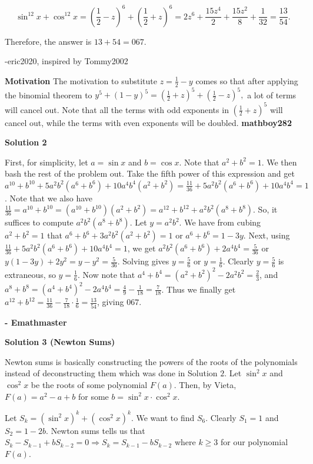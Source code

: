 \begin{enumerate}
 
 \[\sin^{12}{x}+\cos^{12}{x}=\left(\frac{1}{2}-z\right)^6+\left(\frac{1}{2}+z\right)^6=2z^6 + \frac{15z^4}{2} + \frac{15z^2}{8} + \frac{1}{32}=\frac{13}{54}.\]

 Therefore, the answer is $13+54=\boxed{067}$.

 -eric2020, inspired by Tommy2002

 \textbf{Motivation} The motivation to substitute $z=\frac{1}{2}-y$ comes so that after applying the binomial theorem to $y^5+(1-y)^5=\left(\frac{1}{2}+z\right)^5+\left(\frac{1}{2}-z\right)^5,$ a lot of terms will cancel out. Note that all the terms with odd exponents in $\left(\frac{1}{2}+z\right)^5$ will cancel out, while the terms with even exponents will be doubled. \textbf{mathboy282}

 



\textbf{Solution 2}

First, for simplicity, let $a=\sin{x}$ and $b=\cos{x}$. Note that $a^2+b^2=1$. We then bash the rest of the problem out. Take the fifth power of this expression and get $a^{10}+b^{10}+5a^2b^2(a^6+b^6)+10a^4b^4(a^2+b^2)=\frac{11}{36}+5a^2b^2(a^6+b^6)+10a^4b^4=1$. Note that we also have $\frac{11}{36}=a^{10}+b^{10}=(a^{10}+b^{10})(a^2+b^2)=a^{12}+b^{12}+a^2b^2(a^8+b^8)$. So, it suffices to compute $a^2b^2(a^8+b^8)$. Let $y=a^2b^2$. We have from cubing $a^2+b^2=1$ that $a^6+b^6+3a^2b^2(a^2+b^2)=1$ or $a^6+b^6=1-3y$. Next, using $\frac{11}{36}+5a^2b^2(a^6+b^6)+10a^4b^4=1$, we get $a^2b^2(a^6+b^6)+2a^4b^4=\frac{5}{36}$ or $y(1-3y)+2y^2=y-y^2=\frac{5}{36}$. Solving gives $y=\frac{5}{6}$ or $y=\frac{1}{6}$. Clearly $y=\frac{5}{6}$ is extraneous, so $y=\frac{1}{6}$. Now note that $a^4+b^4=(a^2+b^2)^2-2a^2b^2=\frac{2}{3}$, and $a^8+b^8=(a^4+b^4)^2-2a^4b^4=\frac{4}{9}-\frac{1}{18}=\frac{7}{18}$. Thus we finally get $a^{12}+b^{12}=\frac{11}{36}-\frac{7}{18}\cdot\frac{1}{6}=\frac{13}{54}$, giving $\boxed{067}$.

 \textbf{- Emathmaster}

 



\textbf{Solution 3 (Newton Sums)}

Newton sums is basically constructing the powers of the roots of the polynomials instead of deconstructing them which was done in Solution $2$. Let $\sin^2x$ and $\cos^2x$ be the roots of some polynomial $F(a)$. Then, by Vieta, $F(a)=a^2-a+b$ for some $b=\sin^2x\cdot\cos^2x$.

 Let $S_k=\left(\sin^2x\right)^k+\left(\cos^2x\right)^k$. We want to find $S_6$. Clearly $S_1=1$ and $S_2=1-2b$. Newton sums tells us that $S_k-S_{k-1}+bS_{k-2}=0\Rightarrow S_k=S_{k-1}-bS_{k-2}$ where $k\ge 3$ for our polynomial $F(a)$. 


\end{enumerate}
